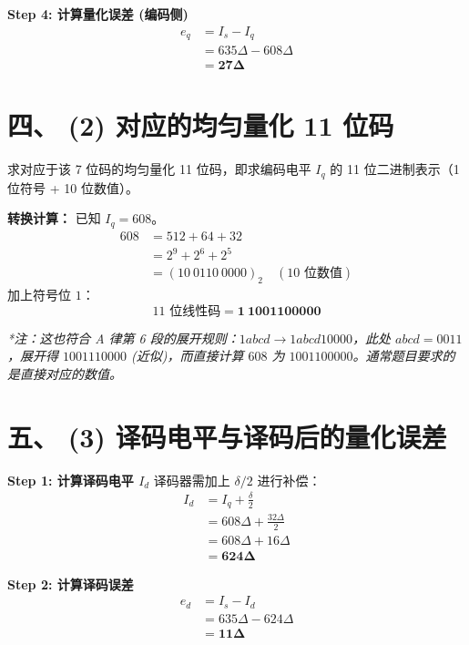 \documentclass[a4paper,11pt]{ctexart}
\begin{document}
    \textbf{Step 4: 计算量化误差 (编码侧)}
    \begin{align*}
        e_q &= I_s - I_q \\
            &= 635\Delta - 608\Delta \\
            &= \mathbf{27\Delta}
    \end{align*}

    \hrulefill

    \section*{四、 (2) 对应的均匀量化 11 位码}
    
    求对应于该 7 位码的均匀量化 11 位码，即求编码电平 $I_q$ 的 11 位二进制表示（1 位符号 + 10 位数值）。
    
    \textbf{转换计算：}
    已知 $I_q = 608$。
    \begin{align*}
        608 &= 512 + 64 + 32 \\
            &= 2^9 + 2^6 + 2^5 \\
            &= (10 \ 0110 \ 0000)_2 \quad (\text{10 位数值})
    \end{align*}
    加上符号位 $1$：
    $$ \text{11 位线性码} = \mathbf{1 \ 1001100000} $$
    
    \textit{*注：这也符合 A 律第 6 段的展开规则：$1abcd \rightarrow 1abcd10000$，此处 $abcd=0011$，展开得 $1001110000$ (近似)，而直接计算 $608$ 为 $1001100000$。通常题目要求的是直接对应的数值。}

    \hrulefill

    \section*{五、 (3) 译码电平与译码后的量化误差}
    
    \textbf{Step 1: 计算译码电平 $I_d$}
    译码器需加上 $\delta/2$ 进行补偿：
    \begin{align*}
        I_d &= I_q + \frac{\delta}{2} \\
            &= 608\Delta + \frac{32\Delta}{2} \\
            &= 608\Delta + 16\Delta \\
            &= \mathbf{624\Delta}
    \end{align*}
    
    \textbf{Step 2: 计算译码误差}
    \begin{align*}
        e_d &= I_s - I_d \\
            &= 635\Delta - 624\Delta \\
            &= \mathbf{11\Delta}
    \end{align*}
    
\end{document}
